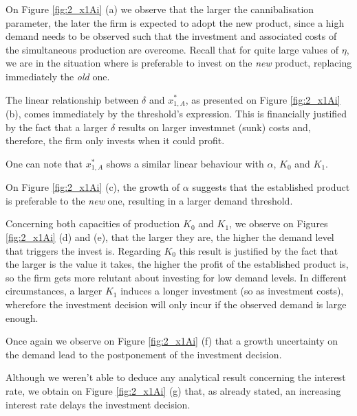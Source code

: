 On Figure \ref{fig:2_x1Ai} (a) we observe that the larger the cannibalisation parameter, the later the firm is expected to adopt the new product, since a high demand needs to be observed such that the investment and associated costs of the simultaneous production are overcome. Recall that for quite large values of $\eta$, we are in the situation where is preferable to invest on the \textit{new} product, replacing immediately the \textit{old} one.

The linear relationship between $\delta$ and $x_{1,A}^*$, as presented on Figure \ref{fig:2_x1Ai} (b), comes immediately  by the threshold's expression. This is financially justified by the fact that a larger $\delta$ results on larger investmnet (sunk) costs and, therefore, the firm only invests when it could profit. 

One can note that $x^*_{1,A}$ shows a similar linear behaviour with $\alpha$, $K_0$ and $K_1$. 

On Figure \ref{fig:2_x1Ai} (c), the growth of $\alpha$ suggests that the established product is preferable to the \textit{new} one, resulting in a larger demand threshold.

Concerning both capacities of production $K_0$ and $K_1$, we observe on Figures \ref{fig:2_x1Ai} (d) and (e), that the larger they are, the higher the demand level that triggers the invest is. Regarding $K_0$ this result is justified by the fact that the larger is the value it takes, the higher the profit of the established product is, so the firm gets more relutant about investing for low demand levels. In different circumstances, a larger $K_1$ induces a longer investment (so as investment costs), wherefore the investment decision will only incur if the observed demand is large enough. 



Once again we observe on Figure \ref{fig:2_x1Ai} (f) that a growth uncertainty on the demand lead to the postponement of the investment decision. 

Although we weren't able to deduce any analytical result concerning the interest rate, we obtain on Figure \ref{fig:2_x1Ai} (g) that, as already stated, an increasing interest rate delays the investment decision.


